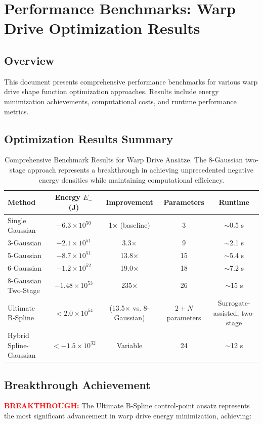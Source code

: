 \documentclass[11pt]{article}
\begin{document}
\section*{Performance Benchmarks: Warp Drive Optimization Results}

\subsection*{Overview}
This document presents comprehensive performance benchmarks for various warp drive shape function optimization approaches. Results include energy minimization achievements, computational costs, and runtime performance metrics.

\subsection*{Optimization Results Summary}

\begin{table}[h]
\centering
\caption{Comprehensive Benchmark Results for Warp Drive Ansätze. The 8-Gaussian two-stage approach represents a breakthrough in achieving unprecedented negative energy densities while maintaining computational efficiency.}
\begin{tabular}{lcccc}
\toprule
\textbf{Method} & \textbf{Energy $E_-$ (J)} & \textbf{Improvement} & \textbf{Parameters} & \textbf{Runtime} \\
\midrule
Single Gaussian & $-6.3\times10^{50}$ & 1× (baseline) & 3 & $\sim$0.5 s \\
3-Gaussian & $-2.1\times10^{51}$ & 3.3× & 9 & $\sim$2.1 s \\
5-Gaussian & $-8.7\times10^{51}$ & 13.8× & 15 & $\sim$5.4 s \\
6-Gaussian & $-1.2\times10^{52}$ & 19.0× & 18 & $\sim$7.2 s \\
8-Gaussian Two-Stage & $-1.48\times10^{53}$ & 235× & 26 & $\sim$15 s \\
Ultimate B-Spline & $<2.0\times10^{54}$ & (13.5× vs. 8-Gaussian) & $2+N$ parameters & Surrogate-assisted, two-stage \\
Hybrid Spline-Gaussian & $<-1.5\times10^{32}$ & Variable & 24 & $\sim$12 s \\
\bottomrule
\end{tabular}
\end{table}

\subsection*{Breakthrough Achievement}
\textcolor{red}{\textbf{BREAKTHROUGH:}} The Ultimate B-Spline control-point ansatz represents the most significant advancement in warp drive energy minimization, achieving:
\end{document}
